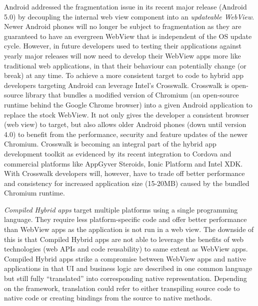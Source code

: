\documentclass[thesis.tex]{subfiles}
\begin{document}
Android addressed the fragmentation issue in its recent major release (Android 5.0) by decoupling the internal web view component into an \textit{updateable WebView}. Newer Android phones will no longer be subject to fragmentation as they are guaranteed to have an evergreen WebView that is independent of the OS update cycle. However, in future developers used to testing their applications against yearly major releases will now need to develop their WebView apps more like traditional web applications, in that their behaviour can potentially change (or break) at any time. To achieve a more consistent target to code to hybrid app developers targeting Android can leverage Intel's Crosswalk. Crosswalk is open-source library that bundles a modified version of Chromium (an open-source runtime behind the Google Chrome browser) into a given Android application to replace the stock WebView. It not only gives the developer a consistent browser (web view) to target, but also allows older Android phones (down until version 4.0) to benefit from the performance, security and feature updates of the newer Chromium. Crosswalk is becoming an integral part of the hybrid app development toolkit as evidenced by its recent integration to Cordova and commercial platforms like AppGyver Steroids, Ionic Platform and Intel XDK. With Crosswalk developers will, however, have to trade off better performance and consistency for increased application size (15-20MB) caused by the bundled Chromium runtime.

\textit{Compiled Hybrid apps} target multiple platforms using a single programming language. They require less platform-specific code and offer better performance than WebView apps as the application is not run in a web view. The downside of this is that Compiled Hybrid apps are not able to leverage the benefits of web technologies (web APIs and code reusability) to same extent as WebView apps. Compiled Hybrid apps strike a compromise between WebView apps and native applications in that UI and business logic are described in one common language but still fully ``translated'' into corresponding native representation. Depending on the framework, translation could refer to either transpiling source code to native code or creating bindings from the source to native methods.
\end{document}
